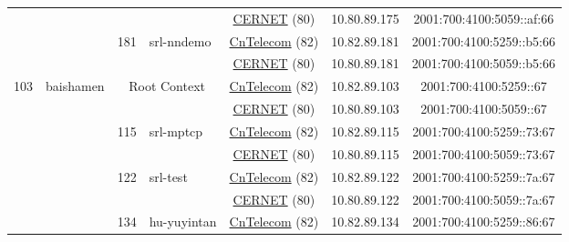 \begin{small}
\begin{center}
\begin{longtable}{|c|c|c|c|c|c|c|c|}
  &  &  &  & \multicolumn{2}{|c|}{\tiny{\href{http://www.cernet.edu.cn}{CERNET} (80)}} & \tiny{10.80.89.175} & \tiny{2001:700:4100:5059::af:66} \\* \cline{3-3}\cline{4-4}\cline{5-5}\cline{6-6}\cline{7-7}\cline{8-8}
  &  & \multirow{2}{*}{\tiny{181}} & \multicolumn{1}{|l|}{\multirow{2}{*}{\tiny{srl-nndemo}}} & \multicolumn{2}{|c|}{\tiny{\href{http://www.chinatelecom.com.cn}{CnTelecom} (82)}} & \tiny{10.82.89.181} & \tiny{2001:700:4100:5259::b5:66} \\* \cline{5-5}\cline{6-6}\cline{7-7}\cline{8-8}
  &  &  &  & \multicolumn{2}{|c|}{\tiny{\href{http://www.cernet.edu.cn}{CERNET} (80)}} & \tiny{10.80.89.181} & \tiny{2001:700:4100:5059::b5:66} \\ \hline
 \multirow{38}{*}{\tiny{103}} & \multicolumn{1}{|l|}{\multirow{38}{*}{\tiny{baishamen}}} & \multicolumn{2}{|c|}{\multirow{2}{*}{\tiny{Root Context}}} & \multicolumn{2}{|c|}{\tiny{\href{http://www.chinatelecom.com.cn}{CnTelecom} (82)}} & \tiny{10.82.89.103} & \tiny{2001:700:4100:5259::67} \\* \cline{5-5}\cline{6-6}\cline{7-7}\cline{8-8}
  &  & \multicolumn{2}{|c|}{} & \multicolumn{2}{|c|}{\tiny{\href{http://www.cernet.edu.cn}{CERNET} (80)}} & \tiny{10.80.89.103} & \tiny{2001:700:4100:5059::67} \\* \cline{3-3}\cline{4-4}\cline{5-5}\cline{6-6}\cline{7-7}\cline{8-8}
  &  & \multirow{2}{*}{\tiny{115}} & \multicolumn{1}{|l|}{\multirow{2}{*}{\tiny{srl-mptcp}}} & \multicolumn{2}{|c|}{\tiny{\href{http://www.chinatelecom.com.cn}{CnTelecom} (82)}} & \tiny{10.82.89.115} & \tiny{2001:700:4100:5259::73:67} \\* \cline{5-5}\cline{6-6}\cline{7-7}\cline{8-8}
  &  &  &  & \multicolumn{2}{|c|}{\tiny{\href{http://www.cernet.edu.cn}{CERNET} (80)}} & \tiny{10.80.89.115} & \tiny{2001:700:4100:5059::73:67} \\* \cline{3-3}\cline{4-4}\cline{5-5}\cline{6-6}\cline{7-7}\cline{8-8}
  &  & \multirow{2}{*}{\tiny{122}} & \multicolumn{1}{|l|}{\multirow{2}{*}{\tiny{srl-test}}} & \multicolumn{2}{|c|}{\tiny{\href{http://www.chinatelecom.com.cn}{CnTelecom} (82)}} & \tiny{10.82.89.122} & \tiny{2001:700:4100:5259::7a:67} \\* \cline{5-5}\cline{6-6}\cline{7-7}\cline{8-8}
  &  &  &  & \multicolumn{2}{|c|}{\tiny{\href{http://www.cernet.edu.cn}{CERNET} (80)}} & \tiny{10.80.89.122} & \tiny{2001:700:4100:5059::7a:67} \\* \cline{3-3}\cline{4-4}\cline{5-5}\cline{6-6}\cline{7-7}\cline{8-8}
  &  & \multirow{2}{*}{\tiny{134}} & \multicolumn{1}{|l|}{\multirow{2}{*}{\tiny{hu-yuyintan}}} & \multicolumn{2}{|c|}{\tiny{\href{http://www.chinatelecom.com.cn}{CnTelecom} (82)}} & \tiny{10.82.89.134} & \tiny{2001:700:4100:5259::86:67} \\* \cline{5-5}\cline{6-6}\cline{7-7}\cline{8-8}

\end{longtable}
\end{center}
\end{small}
